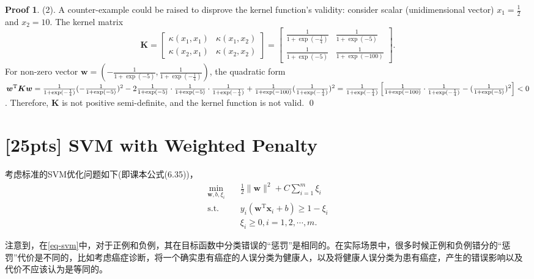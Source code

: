 \documentclass[a4paper,UTF8]{article}
\numberwithin{equation}{section}
\theoremstyle{definition}
\newtheorem*{prove}{Proof}
\begin{document}
\begin{prove}
\item[(2).] A counter-example could be raised to disprove the kernel function's validity: consider scalar (unidimensional vector) $x_1=\frac{1}{2}$ and $x_2=10$. The kernel matrix
\begin{equation}
\bm{K}=\left[\begin{array}{ll}\kappa(x_1,x_1)&\kappa(x_1,x_2)\\\kappa(x_2,x_1)&\kappa(x_2,x_2)\end{array}\right]=\left[\begin{array}{ll}\frac{1}{1+\exp(-\frac{1}{4})}&\frac{1}{1+\exp(-5)}\\\frac{1}{1+\exp(-5)}&\frac{1}{1+\exp(-100)}\end{array}\right].
\end{equation}
For non-zero vector $\bm{w}=(-\frac{1}{1+\exp(-5)}, \frac{1}{1+\exp(-\frac{1}{4})})$, the quadratic form $\bm{w}^\mathrm{T}\bm{K}\bm{w}\\=\frac{1}{1+\exp(-\frac{1}{4})}(-\frac{1}{1+\exp(-5)})^2-2\frac{1}{1+\exp(-5)}\cdot\frac{1}{1+\exp(-5)}\cdot\frac{1}{1+\exp(-\frac{1}{4})}+\frac{1}{1+\exp(-100)}(\frac{1}{1+\exp(-\frac{1}{4})})^2\\=\frac{1}{1+\exp(-\frac{1}{4})}\left[\frac{1}{1+\exp(-100)}\cdot\frac{1}{1+\exp(-\frac{1}{4})}-(\frac{1}{1+\exp(-5)})^2\right]<0$. Therefore, $\bm{K}$ is not positive semi-definite, and the kernel function is not valid.
\qed
~\\
\end{prove}

\section{[25pts] SVM with Weighted Penalty}
考虑标准的SVM优化问题如下(即课本公式(6.35))，
\begin{equation}
\label{eq-svm}
\begin{split}
\min_{\mathbf{w},b,\xi_i}& \quad \frac{1}{2} \lVert \mathbf{w} \rVert^2 + C\sum_{i=1}^m\xi_i\\
\text{s.t.}&  \quad y_i(\mathbf{w}^\mathrm{T}\mathbf{x}_i + b)\geq 1-\xi_i\\
& \quad \xi_i \geq 0, i = 1,2,\cdots,m.
\end{split}
\end{equation}

注意到，在\eqref{eq-svm}中，对于正例和负例，其在目标函数中分类错误的“惩罚”是相同的。在实际场景中，很多时候正例和负例错分的“惩罚”代价是不同的，比如考虑癌症诊断，将一个确实患有癌症的人误分类为健康人，以及将健康人误分类为患有癌症，产生的错误影响以及代价不应该认为是等同的。
\end{document}
